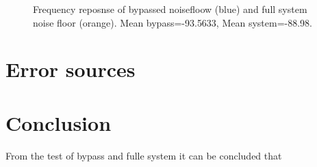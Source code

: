 \begin{figure}[H]
	\centering
	
	\caption{Frequency reposnse of bypassed noisefloow (blue) and full system noise floor (orange). Mean bypass=-93.5633, Mean system=-88.98.}
	\label{fig:FFreqNoiseComp}
\end{figure}


\section{Error sources}


\section{Conclusion}
From the test of bypass and fulle system it can be concluded that 